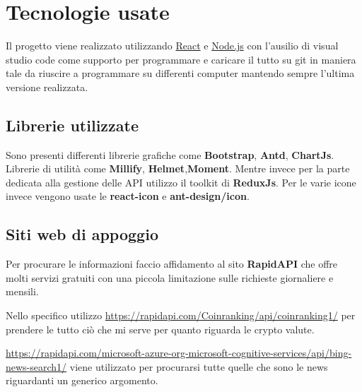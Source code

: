\documentclass{article}
\begin{document}
\section{Tecnologie usate}

Il progetto viene realizzato utilizzando \href{https://it.reactjs.org/}{React} e
\href{https://nodejs.org/it/}{Node.js} con l'ausilio di visual studio code come supporto per programmare e caricare il tutto su git in maniera tale da riuscire a programmare su differenti computer mantendo sempre l'ultima versione realizzata.

\subsection{Librerie utilizzate}
Sono presenti differenti librerie grafiche come
\textbf{Bootstrap}, \textbf{Antd}, \textbf{ChartJs}.
Librerie di utilità come \textbf{Millify}, \textbf{Helmet},\textbf{Moment}.
Mentre invece per la parte dedicata alla gestione delle API utilizzo il toolkit di \textbf{ReduxJs}.
Per le varie icone invece vengono usate le \textbf{react-icon} e \textbf{ant-design/icon}.

\subsection{Siti web di appoggio}
Per procurare le informazioni faccio affidamento al sito \textbf{RapidAPI} che offre molti servizi gratuiti con una piccola limitazione sulle richieste giornaliere e mensili. 


Nello specifico utilizzo \url{https://rapidapi.com/Coinranking/api/coinranking1/}
per prendere le tutto ciò che mi serve per quanto riguarda le crypto valute.


\url{https://rapidapi.com/microsoft-azure-org-microsoft-cognitive-services/api/bing-news-search1/} viene utilizzato per procurarsi tutte quelle che sono le news riguardanti un generico argomento.
\end{document}
